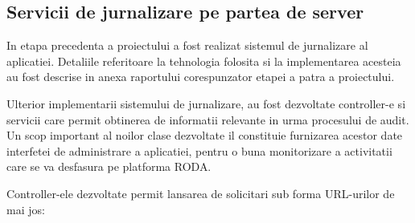 \subsection{Servicii de jurnalizare pe partea de server}

In etapa precedenta a proiectului a fost realizat sistemul de jurnalizare al aplicatiei. Detaliile referitoare la tehnologia folosita si la implementarea acesteia au fost descrise in anexa raportului corespunzator etapei a patra a proiectului.

Ulterior implementarii sistemului de jurnalizare, au fost dezvoltate controller-e si servicii care permit obtinerea de informatii relevante in urma procesului de audit. Un scop important al noilor clase dezvoltate il constituie furnizarea acestor date interfetei de administrare a aplicatiei, pentru o buna monitorizare a activitatii care se va desfasura pe platforma RODA.

Controller-ele dezvoltate permit lansarea de solicitari sub forma URL-urilor de mai jos:

